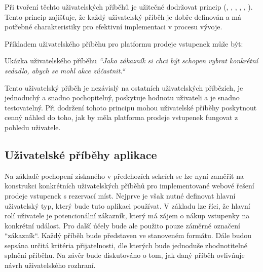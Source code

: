 Při tvoření těchto uživatelských příběhů je užitečné dodržovat princip  (, , , , , ).
Tento princip zajišťuje, že každý uživatelský příběh je dobře definován a má potřebné charakteristiky pro efektivní implementaci v procesu vývoje.

Příkladem uživatelského příběhu pro platformu prodeje vstupenek může být:

\begin{gray-box}{Ukázka uživatelského příběhu}
    \textit{``Jako zákazník si chci být schopen vybrat konkrétní sedadlo, abych se mohl akce zúčastnit.``}
\end{gray-box}

Tento uživatelský příběh je nezávislý na ostatních uživatelských příbězích, je jednoduchý a snadno pochopitelný, poskytuje hodnotu uživateli a je snadno testovatelný.
Při dodržení tohoto principu mohou uživatelské příběhy poskytnout cenný náhled do toho, jak by měla platforma prodeje vstupenek fungovat z pohledu uživatele.

\subsection{Uživatelské příběhy aplikace}
\label{subsec:navrh-ui-uzivatelske-pribehy-aplikace}
Na základě pochopení získaného v předchozích sekcích se lze nyní zaměřit na konstrukci konkrétních uživatelských příběhů pro implementované webové řešení prodeje vstupenek s rezervací míst.
Nejprve je však nutné definovat hlavní uživatelský typ, který bude tuto aplikaci používat.
V základu lze říci, že hlavní rolí uživatele je potencionální zákazník, který má zájem o nákup vstupenky na konkrétní událost.
Pro další účely bude ale použito pouze záměrné označení ``zákazník``.
Každý příběh bude představen ve stanoveném formátu.
Dále budou sepsána určitá kritéria přijatelnosti, dle kterých bude jednoduše zhodnotitelné splnění příběhu.
Na závěr bude diskutováno o tom, jak daný příběh ovlivňuje návrh uživatelského rozhraní.

\newcommand{\userstoryvenuemap}{
}
\userstoryvenuemap

